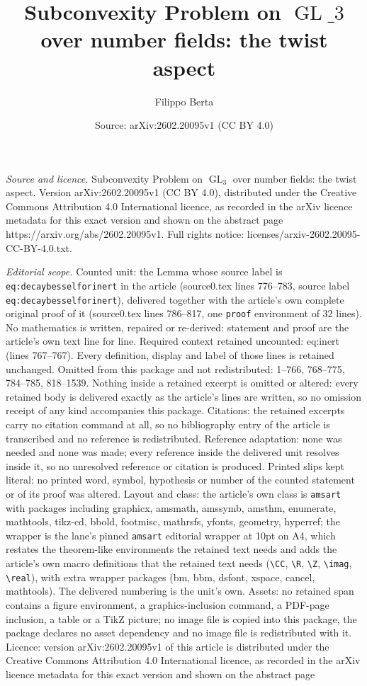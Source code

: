 \documentclass[10pt,a4paper]{amsart}
\title[Subconvexity Problem on $\operatorname{GL}\_3$ over number fi]{Subconvexity Problem on $\operatorname{GL}\_3$ over number fields: the twist aspect}
\author{Filippo Berta}
\date{Source: arXiv:2602.20095v1 (CC BY 4.0)}
\begin{document}
\maketitle

\noindent\emph{Source and licence.} Subconvexity Problem on $\operatorname{GL}_3$ over number fields: the twist aspect. Version arXiv:2602.20095v1 (CC BY 4.0), distributed under the Creative Commons Attribution 4.0 International licence, as recorded in the arXiv licence metadata for this exact version and shown on the abstract page https://arxiv.org/abs/2602.20095v1. Full rights notice: licenses/arxiv-2602.20095-CC-BY-4.0.txt.\par\smallskip

\noindent\textit{Editorial scope.} Counted unit: the Lemma whose source label is \texttt{eq:decaybesselforinert} in the article (source0.tex lines 776--783, source label \texttt{eq:decaybesselforinert}), delivered together with the article's own complete original proof of it (source0.tex lines 786--817, one \texttt{proof} environment of 32 lines). No mathematics is written, repaired or re-derived: statement and proof are the article's own text line for line. Required context retained uncounted: eq:inert (lines 767--767). Every definition, display and label of those lines is retained unchanged. Omitted from this package and not redistributed: 1--766, 768--775, 784--785, 818--1539. Nothing inside a retained excerpt is omitted or altered: every retained body is delivered exactly as the article's lines are written, so no omission receipt of any kind accompanies this package. Citations: the retained excerpts carry no citation command at all, so no bibliography entry of the article is transcribed and no reference is redistributed. Reference adaptation: none was needed and none was made; every reference inside the delivered unit resolves inside it, so no unresolved reference or citation is produced. Printed slips kept literal: no printed word, symbol, hypothesis or number of the counted statement or of its proof was altered. Layout and class: the article's own class is \texttt{amsart} with packages including graphicx, amsmath, amssymb, amsthm, enumerate, mathtools, tikz-cd, bbold, footmisc, mathrsfs, yfonts, geometry, hyperref; the wrapper is the lane's pinned \texttt{amsart} editorial wrapper at 10pt on A4, which restates the theorem-like environments the retained text needs and adds the article's own macro definitions that the retained text needs (\texttt{\textbackslash CC}, \texttt{\textbackslash R}, \texttt{\textbackslash Z}, \texttt{\textbackslash imag}, \texttt{\textbackslash real}), with extra wrapper packages (bm, bbm, dsfont, xspace, cancel, mathtools). The delivered numbering is the unit's own. Assets: no retained span contains a figure environment, a graphics-inclusion command, a PDF-page inclusion, a table or a TikZ picture; no image file is copied into this package, the package declares no asset dependency and no image file is redistributed with it. Licence: version arXiv:2602.20095v1 of this article is distributed under the Creative Commons Attribution 4.0 International licence, as recorded in the arXiv licence metadata for this exact version and shown on the abstract page 
\end{document}
